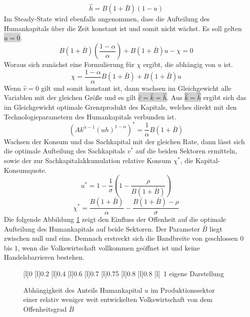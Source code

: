 %
\begin{equation}
	\boxed{\hat{h}=B(1+\bar{B})(1-u)}
\end{equation}
%
Im Steady-State wird ebenfalls angenommen, dass die Aufteilung des Humankapitals über die Zeit konstant ist und somit nicht wächst. Es soll gelten \colorbox{lightgray}{$\hat{u}=0$}.  
%
\begin{equation}
	B (1+\bar{B}) \left(\frac{1- \alpha}{\alpha}\right) + B (1+\bar{B}) u - \chi =0
\end{equation}
%
Woraus sich zunächst eine Formulierung für $\chi$ ergibt, die abhängig von $u$ ist. 
%
\begin{equation}
	\chi = \frac{1- \alpha}{\alpha} B (1+\bar{B}) + B (1+\bar{B}) u
\end{equation}
%
Wenn $\hat{v}=0$ gilt und somit konstant ist, dann wachsen im Gleichgewicht alle Variablen mit der gleichen Größe und es gilt \colorbox{lightgray}{$\hat{c}=\hat{k}=\hat{h}$}. Aus \colorbox{lightgray}{$\hat{k}=\hat{h}$} ergibt sich das im Gleichgewicht optimale Grenzprodukt des Kapitals, welches direkt mit den Technologieparametern des Humankapitals verbunden ist.
%
\begin{equation}
	\boxed{(Ak^{\alpha -1} (uh)^{1- \alpha})^* = \frac{1}{\alpha} B (1+\bar{B})}
\end{equation}
%
Wachsen der Konsum und das Sachkapital mit der gleichen Rate, dann lässt sich die optimale Aufteilung des Sachkapitals $v^*$ auf die beiden Sektoren ermitteln, sowie der zur Sachkapitalakkumulation relative Konsum $\chi^*$, die Kapital-Konsumquote.
%
\begin{equation}
	\boxed{u^*= 1- \frac{1}{\sigma}\left(1-  \frac{\rho}{B (1+\bar{B})}\right)}
\end{equation}
%
\begin{equation}
	\boxed{\chi^* = \frac{B (1+\bar{B})}{\alpha}- \frac{B (1+\bar{B})- \rho}{\sigma}}
\end{equation}
%
Die folgende Abbildung \ref{fig:VeränderungHumankapitalOffenheitEL} zeigt den Einfluss der Offenheit auf die optimale Aufteilung des Humankapitals auf beide Sektoren. Der Parameter $\bar{B}$ liegt zwischen null und eins. Demnach erstreckt sich die Bandbreite von geschlossen $0$ bis $1$, wenn die Volkswirtschaft vollkommen geöffnet ist und keine Handelsbarrieren bestehen. \\
%
\begin{figure}[htb] 
\vspace{0.13cm}
 \centering 
		[l]{\footnotesize{0}}
		[l]{\footnotesize{0.2}}
		[l]{\footnotesize{0.4}}
		[l]{\footnotesize{0.6}}
		[l]{\footnotesize{0.7}}
		[l]{\footnotesize{0.75}}
		[l]{\footnotesize{0.8}}
		[l]{\footnotesize{0.8}}
		[l]{~\footnotesize{1}}
	\hfill{}  eigene Darstellung
	\caption{Abhängigkeit des Anteils Humankapital $u$ im Produktionssektor einer relativ weniger weit entwickelten Volkswirtschaft von dem Offenheitsgrad $\bar{B}$}
	\label{fig:VeränderungHumankapitalOffenheitEL}
\end{figure}
